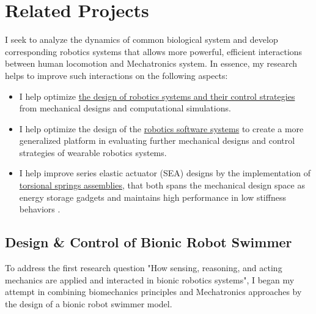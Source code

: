 \documentclass[8pt]{article}
\begin{document}

 

% 

\section{Related Projects}

I seek to analyze the dynamics of common biological system and develop corresponding robotics systems that allows more powerful, efficient interactions between human locomotion and Mechatronics system. In essence, my research helps to improve such interactions on the following aspects: 

\begin{itemize}

    \item {I help optimize \hyperref[sec:RobotSwimmer]{the design of robotics systems and their control strategies} from mechanical designs and computational simulations.}

    \item {I help optimize the design of the \hyperref[sec:OSL-Library]{robotics software systems} to create a more generalized platform in evaluating further mechanical designs and control strategies of wearable robotics systems.}

    \item {I help improve series elastic actuator (SEA) designs by the implementation of \hyperref[sec:series-spring]{torsional springs assemblies}, that both spans the mechanical design space as energy storage gadgets and maintains high performance in low stiffness behaviors \cite{SpringDesign_OSL}.}
    
    
    

\end{itemize}


    \subsection{Design \& Control of Bionic Robot Swimmer}  \label{sec:RobotSwimmer}
    
    To address the first research question "How sensing, reasoning, and acting mechanics are applied and interacted in bionic robotics systems", I began my attempt in combining biomechanics principles and Mechatronics approaches by the design of a bionic robot swimmer model.
\end{document}
